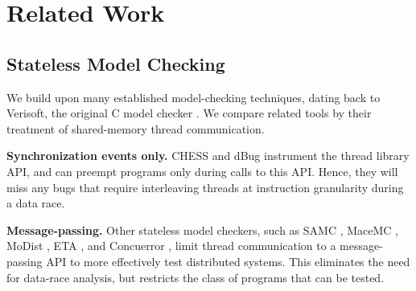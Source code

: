 \section{Related Work}
\label{sec:related}

\subsection{Stateless Model Checking}

We build upon many established model-checking techniques, dating back
to Verisoft, the original C model checker \cite{verisoft}.
We compare related tools by their treatment of shared-memory thread communication.

{\bf Synchronization events only.} CHESS \cite{chess} and dBug \cite{dbug-ssv} instrument the thread library API, and can preempt programs only during calls to this API.
Hence, they will miss any bugs that require interleaving threads at instruction granularity during a data race.

{\bf Message-passing.} Other stateless model checkers, such as SAMC \cite{samc}, MaceMC \cite{macemc}, MoDist \cite{modist}, ETA \cite{dbug-retreat}, and Concuerror \cite{optimal-dpor},
limit thread communication to a message-passing API to more effectively test distributed systems.
This eliminates the need for data-race analysis, but restricts the class of programs that can be tested.

